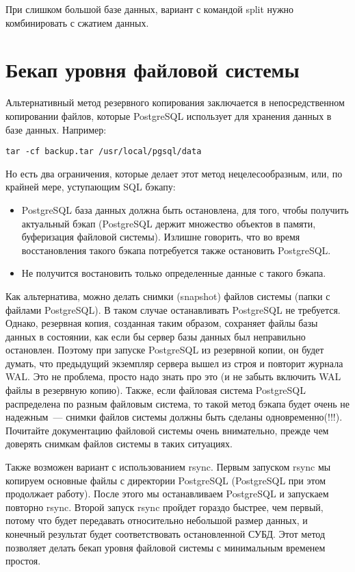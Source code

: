 При слишком большой базе данных, вариант с командой split нужно комбинировать с сжатием данных.


\section{Бекап уровня файловой системы}
Альтернативный метод резервного копирования заключается в непосредственном копировании файлов, 
которые PostgreSQL использует для хранения данных в базе данных. Например:
\begin{lstlisting}[label=lst:backups14,caption=Бэкап PostgreSQL файлов]
tar -cf backup.tar /usr/local/pgsql/data
\end{lstlisting}

Но есть два ограничения, которые делает этот метод нецелесообразным, или, по крайней мере, уступающим SQL бэкапу:
\begin{itemize}
\item PostgreSQL база данных должна быть остановлена, для того, чтобы получить актуальный бэкап 
(PostgreSQL держит множество объектов в памяти, буферизация файловой системы). Излишне говорить, 
что во время восстановления такого бэкапа потребуется также остановить PostgreSQL.
\item Не получится востановить только определенные данные с такого бэкапа.
\end{itemize}

Как альтернатива, можно делать снимки (snapshot) файлов системы (папки с файлами PostgreSQL). В таком случае останавливать PostgreSQL 
не требуется. Однако, резервная копия, созданная таким образом, сохраняет файлы базы данных в состоянии, как если бы сервер базы данных 
был неправильно остановлен. Поэтому при запуске PostgreSQL из резервной копии, он будет думать, что предыдущий экземпляр 
сервера вышел из строя и повторит журнала WAL. Это не проблема, просто надо знать про это (и не забыть включить WAL файлы 
в резервную копию). Также, если файловая система PostgreSQL распределена по разным файловым система, то такой метод бэкапа 
будет очень не надежным~--- снимки файлов системы должны быть сделаны одновременно(!!!). Почитайте документацию файловой 
системы очень внимательно, прежде чем доверять снимкам файлов системы в таких ситуациях.

Также возможен вариант с использованием rsync. Первым запуском rsync мы копируем основные файлы с директории PostgreSQL 
(PostgreSQL при этом продолжает работу). После этого 
мы останавливаем PostgreSQL и запускаем повторно rsync. Второй запуск rsync пройдет гораздо быстрее, чем первый, 
потому что будет передавать относительно небольшой размер данных, 
и конечный результат будет соответствовать остановленной СУБД. 
Этот метод позволяет делать бекап уровня файловой системы с минимальным временем простоя.


